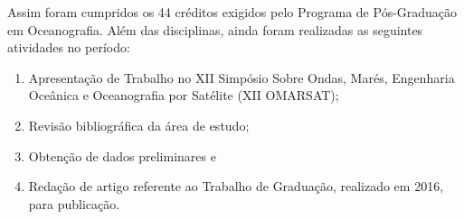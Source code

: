 \bigskip

\hspace{5mm} Assim foram cumpridos os 44 créditos exigidos pelo Programa de Pós-Graduação em Oceanografia. Além das disciplinas, ainda foram realizadas as seguintes atividades no período:

\vspace{-\topsep}
\begin{enumerate}[noitemsep]
    \item Apresentação de Trabalho no XII Simpósio Sobre Ondas, Marés, Engenharia Oceânica e Oceanografia por Satélite (XII OMARSAT);
    \item Revisão bibliográfica da área de estudo;
    \item Obtenção de dados preliminares e
    \item Redação de artigo referente ao Trabalho de Graduação, realizado em 2016, \\ para publicação.
\end{enumerate}